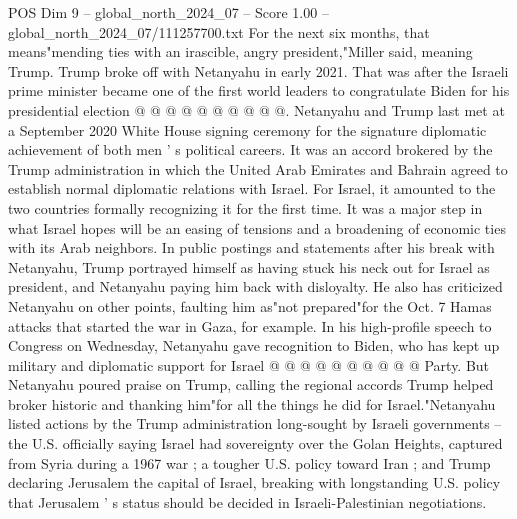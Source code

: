\begin{textsample}{POS Dim 9 – global\_north\_2024\_07 – Score 1.00 – global\_north\_2024\_07/111257700.txt}
For the next six months, that means"mending ties with an irascible, angry president,"Miller said, meaning Trump.
Trump broke off with Netanyahu in early 2021.
That was after the Israeli prime minister became one of the first world leaders to congratulate Biden for his presidential election @ @ @ @ @ @ @ @ @ @.
Netanyahu and Trump last met at a September 2020 White House signing ceremony for the signature diplomatic achievement of both men ' s political careers.
It was an accord brokered by the Trump administration in which the United Arab Emirates and Bahrain agreed to establish normal diplomatic relations with Israel.
For Israel, it amounted to the two countries formally recognizing it for the first time.
It was a major step in what Israel hopes will be an easing of tensions and a broadening of economic ties with its Arab neighbors.
In public postings and statements after his break with Netanyahu, Trump portrayed himself as having stuck his neck out for Israel as president, and Netanyahu paying him back with disloyalty.
He also has criticized Netanyahu on other points, faulting him as"not prepared"for the Oct. 7 Hamas attacks that started the war in Gaza, for example.
In his high-profile speech to Congress on Wednesday, Netanyahu gave recognition to Biden, who has kept up military and diplomatic support for Israel @ @ @ @ @ @ @ @ @ @ Party.
But Netanyahu poured praise on Trump, calling the regional accords Trump helped broker historic and thanking him"for all the things he did for Israel."Netanyahu listed actions by the Trump administration long-sought by Israeli governments -- the U.S. officially saying Israel had sovereignty over the Golan Heights, captured from Syria during a 1967 war ; a tougher U.S. policy toward Iran ; and Trump declaring Jerusalem the capital of Israel, breaking with longstanding U.S. policy that Jerusalem ' s status should be decided in Israeli-Palestinian negotiations.

\end{textsample}
